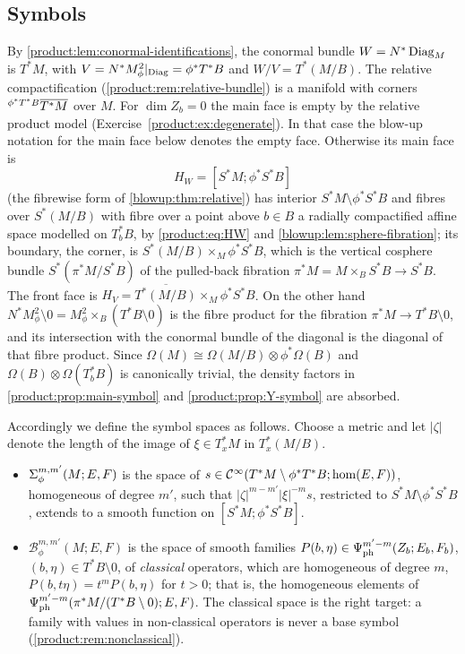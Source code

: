 \subsection{Symbols}
By \cref{product:lem:conormal-identifications}, the conormal bundle
$W=N^*\operatorname{Diag}_M$ is $T^*M$, with $V=N^*M^2_\phi|_{\operatorname{Diag}}=\phi^*T^*B$ and
$W/V=T^*(M/B)$. The relative compactification (\cref{product:rem:relative-bundle})
is a manifold with corners
${}^{\phi^*T^*B}\overline{T^*M}$ over $M$. For $\dim Z_b=0$ the main face
is empty by the relative product model (Exercise~\ref{product:ex:degenerate}).
In that case the blow-up notation for the main face below denotes the empty
face. Otherwise its main face is
\begin{equation*}
H_W=[S^*M;\phi^*S^*B]
\end{equation*}
(the fibrewise form of \cref{blowup:thm:relative}) has interior $S^*M\setminus\phi^*S^*B$ and fibres over $S^*(M/B)$ with fibre
over a point above $b\in B$ a radially compactified affine space modelled on
$T^*_bB$, by \eqref{product:eq:HW} and \cref{blowup:lem:sphere-fibration}; its boundary, the corner, is
$S^*(M/B)\times_M\phi^*S^*B$, which is the vertical cosphere bundle
$S^*(\pi^*M/S^*B)$ of the pulled-back fibration $\pi^*M=M\times_BS^*B\longrightarrow
S^*B$. The front face is $H_V=\overline{T^*(M/B)}\times_M\phi^*S^*B$. On the other
hand $N^*M^2_\phi\setminus0=M^2_\phi\times_B(T^*B\setminus0)$ is the fibre product
for the fibration $\pi^*M\longrightarrow T^*B\setminus0$, and its intersection with
the conormal bundle of the diagonal is the diagonal of that fibre product. Since
$\Omega(M)\cong\Omega(M/B)\otimes\phi^*\Omega(B)$ and $\Omega(B)\otimes\Omega(T^*_bB)$
is canonically trivial, the density factors in \cref{product:prop:main-symbol} and
\cref{product:prop:Y-symbol} are absorbed.

Accordingly we define the symbol spaces as follows. Choose a metric and let
$|\zeta|$ denote the length of the image of $\xi\in T^*_xM$ in $T^*_x(M/B)$.
\begin{itemize}
\item $\Sigma^{m,m'}_{\phi}(M;E,F)$ is the space of $s\in\mathcal{C}^\infty(T^*M\setminus\phi^*T^*B;
\hom(E,F))$, homogeneous of degree $m'$, such that $|\zeta|^{m-m'}|\xi|^{-m}s$,
restricted to $S^*M\setminus\phi^*S^*B$, extends to a smooth function on
$[S^*M;\phi^*S^*B]$.
\item $\mathcal B^{m,m'}_\phi(M;E,F)$ is the space of smooth families
$P(b,\eta)\in\Psi^{m'-m}_{\mathrm{ph}}(Z_b;E_b,F_b)$, $(b,\eta)\in
T^*B\setminus0$, of \emph{classical} operators, which are homogeneous of degree $m$,
$P(b,t\eta)=t^mP(b,\eta)$ for $t>0$; that is, the homogeneous elements of
$\Psi^{m'-m}_{\mathrm{ph}}(\pi^*M/(T^*B\setminus0);E,F)$. The classical space is
the right target: a family with values in non-classical operators is never a base
symbol (\cref{product:rem:nonclassical}).
\end{itemize}

